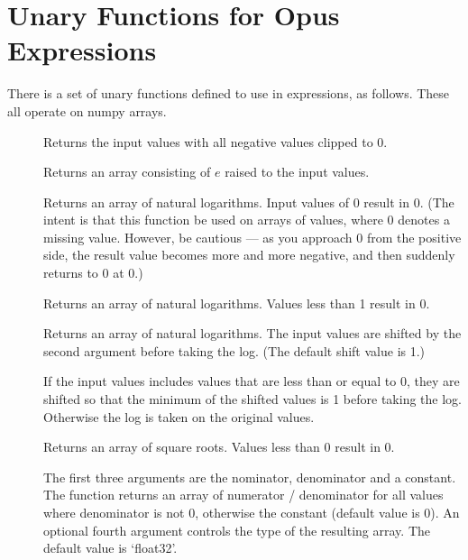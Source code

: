 \section{Unary Functions for Opus Expressions}
\label{sec:functions-for-opus-expressions}

There is a set of unary functions defined to use in expressions, as
follows.  These all operate on numpy arrays.

\begin{description}

\item[]
  Returns the input values with all negative values clipped to 0.

\item[] Returns an array
  consisting of $e$ raised to the input values.

\item[] Returns an array of natural
  logarithms.  Input values of 0 result in 0.  (The intent is that this
  function be used on arrays of values, where 0 denotes a missing value.
  However, be cautious --- as you approach 0 from the positive side, the
  result value becomes more and more negative, and then suddenly returns to
  0 at 0.)

\item[]
  Returns an array of natural logarithms. Values less than 1 result in 0.

\item[]
  Returns an array of natural logarithms.  The input values are shifted by
  the second argument before taking the log.  (The default shift value is 1.)

\item[] If the input values includes values that are less than or equal
  to 0, they are shifted so that the minimum of the shifted values is 1
  before taking the log.  Otherwise the log is taken on the original
  values.

\item[] Returns an array of
  square roots.  Values less than 0 result in 0.

\item[] The first three arguments are the nominator, denominator and a
  constant. The function returns an array of numerator / denominator for
  all values where denominator is not 0, otherwise the constant (default
  value is 0). An optional fourth argument controls the type of the
  resulting array. The default value is `float32'.
\end{description}

